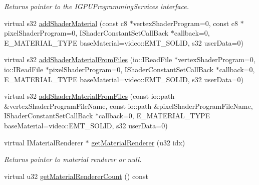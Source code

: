 \begin{DoxyCompactItemize}
\begin{DoxyCompactList}\small\item\em Returns pointer to the I\-G\-P\-U\-Programming\-Services interface. \end{DoxyCompactList}\item 
virtual s32 \hyperlink{classirr_1_1video_1_1_c_null_driver_ae5256323e921de4813e6573f43a41c54}{add\-Shader\-Material} (const c8 $\ast$vertex\-Shader\-Program=0, const c8 $\ast$pixel\-Shader\-Program=0, I\-Shader\-Constant\-Set\-Call\-Back $\ast$callback=0, E\-\_\-\-M\-A\-T\-E\-R\-I\-A\-L\-\_\-\-T\-Y\-P\-E base\-Material=video\-::\-E\-M\-T\-\_\-\-S\-O\-L\-I\-D, s32 user\-Data=0)
\item 
virtual s32 \hyperlink{classirr_1_1video_1_1_c_null_driver_a797552808f12e88bc041fe1c7a35287e}{add\-Shader\-Material\-From\-Files} (io\-::\-I\-Read\-File $\ast$vertex\-Shader\-Program=0, io\-::\-I\-Read\-File $\ast$pixel\-Shader\-Program=0, I\-Shader\-Constant\-Set\-Call\-Back $\ast$callback=0, E\-\_\-\-M\-A\-T\-E\-R\-I\-A\-L\-\_\-\-T\-Y\-P\-E base\-Material=video\-::\-E\-M\-T\-\_\-\-S\-O\-L\-I\-D, s32 user\-Data=0)
\item 
virtual s32 \hyperlink{classirr_1_1video_1_1_c_null_driver_aab55e202aef20b4310fc284bdda75065}{add\-Shader\-Material\-From\-Files} (const io\-::path \&vertex\-Shader\-Program\-File\-Name, const io\-::path \&pixel\-Shader\-Program\-File\-Name, I\-Shader\-Constant\-Set\-Call\-Back $\ast$callback=0, E\-\_\-\-M\-A\-T\-E\-R\-I\-A\-L\-\_\-\-T\-Y\-P\-E base\-Material=video\-::\-E\-M\-T\-\_\-\-S\-O\-L\-I\-D, s32 user\-Data=0)
\item 
\hypertarget{classirr_1_1video_1_1_c_null_driver_a3deeba70b3f8fc605350ce4de14590ad}{virtual I\-Material\-Renderer $\ast$ \hyperlink{classirr_1_1video_1_1_c_null_driver_a3deeba70b3f8fc605350ce4de14590ad}{get\-Material\-Renderer} (u32 idx)}\label{classirr_1_1video_1_1_c_null_driver_a3deeba70b3f8fc605350ce4de14590ad}

\begin{DoxyCompactList}\small\item\em Returns pointer to material renderer or null. \end{DoxyCompactList}\item 
\hypertarget{classirr_1_1video_1_1_c_null_driver_a2342a188bafab373200d53898669bf0b}{virtual u32 \hyperlink{classirr_1_1video_1_1_c_null_driver_a2342a188bafab373200d53898669bf0b}{get\-Material\-Renderer\-Count} () const }\label{classirr_1_1video_1_1_c_null_driver_a2342a188bafab373200d53898669bf0b}


\end{DoxyCompactItemize}
